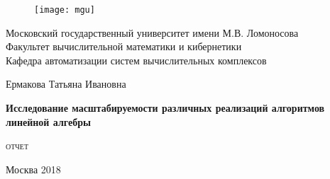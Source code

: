\documentclass[12pt]{article}
\begin{document}
\sloppy

	\begin{titlepage}
		\newpage
		
		\begin{figure}[t]
			\centering
			\texttt{[image: mgu]}
		\end{figure}
		
		\begin{center}
			Московский государственный университет имени М.В. Ломоносова \\
			Факультет вычислительной математики и кибернетики \\
			Кафедра автоматизации систем вычислительных комплексов \\
		\end{center}
		
		\vspace{8em}
		
		\begin{center}
			\large
			Ермакова Татьяна Ивановна
		\end{center}
		
		\begin{center}
			\Large
			\bfseries
			Исследование масштабируемости различных реализаций алгоритмов линейной алгебры
		\end{center}
		
		\vspace{1em}
		
		\begin{center}
			\large
			\textsc{
				отчет
			}
		\end{center}
		
		\vspace{\fill}
		
		\begin{center}
			Москва 2018
		\end{center}
		
	\end{titlepage}
\end{document}

